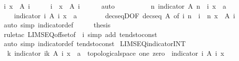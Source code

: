 \begin{isabellebody}
\ {\isachardoublequoteopen}{\isasymexists}i{\isachardot}\ x\ {\isasymnotin}\ A\ i{\isachardoublequoteclose}\isanewline
\ \ \isamarkupfalse%
\ \isamarkupfalse%
\ i\ \ {\isachardoublequoteopen}x\ {\isasymnotin}\ A\ i{\isachardoublequoteclose}\isanewline
\ \ \ \ \isamarkupfalse%
\ auto\isanewline
\ \ \isamarkupfalse%
\ \isamarkupfalse%
\ \isanewline
\ \ \ \ {\isachardoublequoteopen}{\isasymAnd}n{\isachardot}\ {\isacharparenleft}indicator\ {\isacharparenleft}A\ {\isacharparenleft}n\ {\isacharplus}\ i{\isacharparenright}{\isacharparenright}\ x\ {\isacharcolon}{\isacharcolon}\ {\isacharprime}a{\isacharparenright}\ {\isacharequal}\ {}{\isachardoublequoteclose}\isanewline
\ \ \ \ {\isachardoublequoteopen}{\isacharparenleft}indicator\ {\isacharparenleft}{\isasymInter}i{\isachardot}\ A\ i{\isacharparenright}\ x\ {\isacharcolon}{\isacharcolon}\ {\isacharprime}a{\isacharparenright}\ {\isacharequal}\ {}{\isachardoublequoteclose}\isanewline
\ \ \ \ \isamarkupfalse%
\ decseqD{\isacharbrackleft}OF\ {\isacharbackquoteopen}decseq\ A{\isacharbackquoteclose}{\isacharcomma}\ of\ i\ {\isachardoublequoteopen}n\ {\isacharplus}\ i{\isachardoublequoteclose}\ \ n{\isacharbrackright}\ {\isacharbackquoteopen}x\ {\isasymnotin}\ A\ i{\isacharbackquoteclose}\ \isamarkupfalse%
\ {\isacharparenleft}auto\ simp{\isacharcolon}\ indicator{\isacharunderscore}def{\isacharparenright}\isanewline
\ \ \isamarkupfalse%
\ \isamarkupfalse%
\ {\isacharquery}thesis\isanewline
\ \ \ \ \isamarkupfalse%
\ {\isacharparenleft}rule{\isacharunderscore}tac\ LIMSEQ{\isacharunderscore}offset{\isacharbrackleft}of\ {\isacharunderscore}\ i{\isacharbrackright}{\isacharparenright}\ {\isacharparenleft}simp\ add{\isacharcolon}\ tendsto{\isacharunderscore}const{\isacharparenright}\isanewline
{}\isamarkupfalse%
\ {\isacharparenleft}auto\ simp{\isacharcolon}\ indicator{\isacharunderscore}def\ tendsto{\isacharunderscore}const{\isacharparenright}%
\endisatagproof
{\isafoldproof}%
%
\isadelimproof
\isanewline
%
\endisadelimproof
\isanewline
{}\isamarkupfalse%
\ LIMSEQ{\isacharunderscore}indicator{\isacharunderscore}INT{\isacharcolon}\isanewline
\ \ {\isachardoublequoteopen}{\isacharparenleft}{\isasymlambda}k{\isachardot}\ indicator\ {\isacharparenleft}{\isasymInter}i{\isacharless}k{\isachardot}\ A\ i{\isacharparenright}\ x\ {\isacharcolon}{\isacharcolon}\ {\isacharprime}a\ {\isacharcolon}{\isacharcolon}\ {\isacharbraceleft}topological{\isacharunderscore}space{\isacharcomma}\ one{\isacharcomma}\ zero{\isacharbraceright}{\isacharparenright}\ {\isacharminus}{\isacharminus}{\isacharminus}{\isacharminus}{\isachargreater}\ indicator\ {\isacharparenleft}{\isasymInter}i{\isachardot}\ A\ i{\isacharparenright}\ x{\isachardoublequoteclose}\isanewline

\end{isabellebody}
